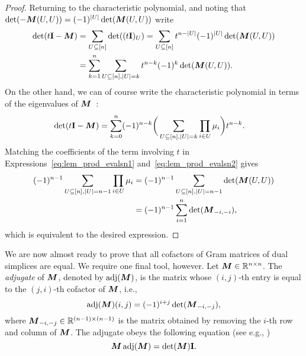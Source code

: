 \begin{proof}
Returning to the characteristic polynomial, and noting that $\det(-{\vb*{M}}(U,U))=(-1)^{|U|}\det({\vb*{M}}(U,U))$ write 
\begin{align}
\det(t\vb{I} - {\vb*{M}}) &= \sum_{U\subseteq[n]} \det((t\vb{I})_U) = \sum_{U\subseteq[n]}t^{n-|U|}(-1)^{|U|} \det({\vb*{M}}(U,U)) \notag \\
&=\sum_{k=1}^n \sum_{U\subseteq[n],|U|=k}t^{n-k}(-1)^k\det({\vb*{M}}(U,U)).\label{eq:lem_prod_evalsn1}
\end{align}
On the other  hand, we can of course  write the characteristic polynomial in  terms of  the  eigenvalues of ${\vb*{M}}$~\cite{brooks2006coefficients}: 
\begin{align}
\det(t\vb{I} -{\vb*{M}}) &= \sum_{k=0}^n (-1)^{n-k}\bigg(\sum_{U\subseteq[n],|U|=k}\prod_{i\in U}\mu_i\bigg)t^{n-k}.\label{eq:lem_prod_evalsn2}
\end{align}
Matching  the coefficients of the term involving  $t$  in  Expressions~\eqref{eq:lem_prod_evalsn1} and~\eqref{eq:lem_prod_evalsn2} gives 
\begin{align*}
(-1)^{n-1}\sum_{U\subseteq[n],|U|=n-1}\prod_{i\in U}\mu_i &= (-1)^{n-1}\sum_{U\subseteq[n],|U|=n-1}\det({\vb*{M}}(U,U)) \\
&= (-1)^{n-1}\sum_{i=1}^n\det({\vb*{M}}_{-i,-i}),
\end{align*}
which  is equivalent to the desired expression. 
\end{proof}


We are  now almost ready to prove  that all cofactors of Gram  matrices of dual simplices are equal. We require one final tool,  however.  
Let ${\vb*{M}}\in\mathbb{R}^{n\times n}$. The \emph{adjugate} of ${\vb*{M}}$, denoted by $\operatorname{\textnormal{adj}}({\vb*{M}})$, is the matrix whose $(i,j)$-th entry is equal to the $(j,i)$-th  cofactor of ${\vb*{M}}$, i.e., 
\begin{equation*}
\operatorname{\textnormal{adj}}({\vb*{M}})(i,j) = (-1)^{i+j}\det({\vb*{M}}_{-i,-j}),
\end{equation*}
where ${\vb*{M}}_{-i,-j}\in\mathbb{R}^{(n-1)\times( n-1)}$ is the matrix obtained by removing the $i$-th row and column of ${\vb*{M}}$. The adjugate obeys  the following equation  (see e.g., \cite{godsil2013algebraic})
\begin{equation}
\label{eq:MadjM}
{\vb*{M}}\operatorname{\textnormal{adj}}({\vb*{M}})=\det({\vb*{M}})\vb{I}.
\end{equation}

